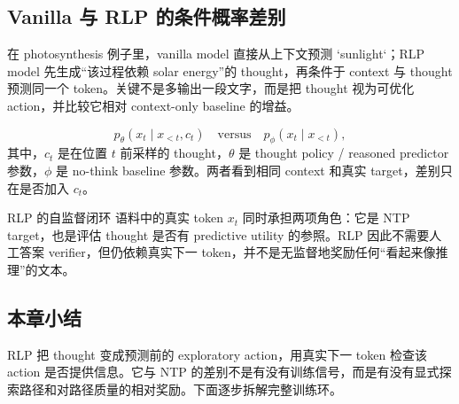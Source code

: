 \subsection{Vanilla 与 RLP 的条件概率差别}

在 photosynthesis 例子里，vanilla model 直接从上下文预测 `sunlight`；RLP model 先生成“该过程依赖 solar energy”的 thought，再条件于 context 与 thought 预测同一个 token。关键不是多输出一段文字，而是把 thought 视为可优化 action，并比较它相对 context-only baseline 的增益。


\[
p_\theta(x_t\mid x_{<t},c_t)
\quad\text{versus}\quad
p_\phi(x_t\mid x_{<t}),
\]
其中，$c_t$ 是在位置 $t$ 前采样的 thought，$\theta$ 是 thought policy / reasoned predictor 参数，$\phi$ 是 no-think baseline 参数。两者看到相同 context 和真实 target，差别只在是否加入 $c_t$。

\begin{importantbox}{RLP 的自监督闭环}
语料中的真实 token $x_t$ 同时承担两项角色：它是 NTP target，也是评估 thought 是否有 predictive utility 的参照。RLP 因此不需要人工答案 verifier，但仍依赖真实下一 token，并不是无监督地奖励任何“看起来像推理”的文本。
\end{importantbox}

\subsection{本章小结}

RLP 把 thought 变成预测前的 exploratory action，用真实下一 token 检查该 action 是否提供信息。它与 NTP 的差别不是有没有训练信号，而是有没有显式探索路径和对路径质量的相对奖励。下面逐步拆解完整训练环。

